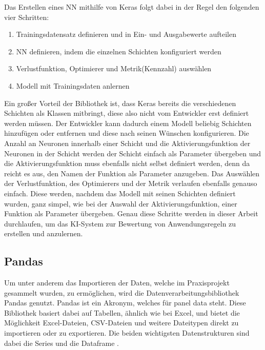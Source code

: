 Das Erstellen eines \ac{NN} mithilfe von Keras folgt dabei in der Regel den folgenden vier Schritten:
\begin{enumerate}
    \item Trainingsdatensatz definieren und in Ein- und Ausgabewerte aufteilen \cite[vgl. S.92]{DL_PY}
    \item \ac{NN} definieren, indem die einzelnen Schichten konfiguriert werden \cite[vgl. S.92]{DL_PY}
    \item Verlustfunktion, Optimierer und Metrik(Kennzahl) auswählen \cite[vgl. S.92]{DL_PY}
    \item Modell mit Trainingsdaten anlernen \cite[vgl. S.92]{DL_PY}
\end{enumerate}
Ein großer Vorteil der Bibliothek ist, dass Keras bereits die verschiedenen Schichten als Klassen mitbringt, diese also nicht vom Entwickler erst definiert werden müssen.
Der Entwickler kann dadurch einem Modell beliebig Schichten hinzufügen oder entfernen und diese nach seinen Wünschen konfigurieren. 
Die Anzahl an Neuronen innerhalb einer Schicht und die Aktivierungsfunktion der Neuronen in der Schicht werden der Schicht einfach als Parameter übergeben 
und die Aktivierungsfunktion muss ebenfalls nicht selbst definiert werden, denn da reicht es aus, den Namen der Funktion als Parameter anzugeben.
Das Auswählen der Verlustfunktion, des Optimierers und der Metrik verlaufen ebenfalls genauso einfach. Diese werden, nachdem das Modell mit seinen Schichten 
definiert wurden, ganz simpel, wie bei der Auswahl der Aktivierungsfunktion, einer Funktion als Parameter übergeben.
Genau diese Schritte werden in dieser Arbeit durchlaufen, um das \ac{KI}-System zur Bewertung von Anwendungsregeln zu erstellen und anzulernen.

\subsection{Pandas}

Um unter anderem das Importieren der Daten, welche im Praxisprojekt gesammelt wurden, zu ermöglichen, wird die Datenverarbeitungsbibliothek Pandas genutzt.
Pandas ist ein Akronym, welches für panel data steht. Diese Bibliothek basiert dabei auf Tabellen, ähnlich wie bei Excel, und bietet die Möglichkeit
Excel-Dateien, CSV-Dateien und weitere Dateitypen direkt zu importieren oder zu exportieren. Die beiden wichtigsten Datenstrukturen sind dabei die
Series und die Dataframe \cite[vgl. S.253]{NumerischesPython}. 

